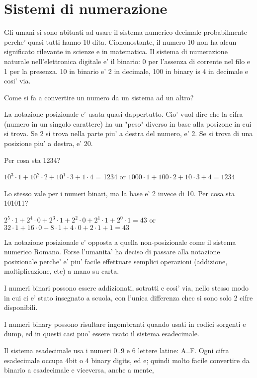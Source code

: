 \section{Sistemi di numerazione}

Gli umani si sono abituati ad usare il sistema numerico decimale probabilmente perche' quasi tutti hanno 10 dita.
Ciononostante, il numero 10 non ha alcun significato rilevante in scienze e in matematica.
Il sistema di numerazione naturale nell'elettronica digitale e' il binario: 0 per l'assenza di corrente nel filo e 1 per la presenza.
10 in binario e' 2 in decimale, 100 in binary is 4 in decimale e cosi' via.

Come si fa a convertire un numero da un sistema ad un altro?

La notazione posizionale e' usata quasi dappertutto. Cio' vuol dire che la cifra (numero in un singolo carattere) ha un "peso" diverso in base alla posizone in cui si trova. 
Se 2 si trova nella parte piu' a destra del numero, e' 2.
Se si trova di una posizione piu' a destra, e' 20.

Per cosa sta 1234?

$10^3 \cdot 1 + 10^2 \cdot 2 + 10^1 \cdot 3 + 1 \cdot 4$ = 1234 or 
$1000 \cdot 1 + 100 \cdot 2 + 10 \cdot 3 + 4 = 1234$

Lo stesso vale per i numeri binari, ma la base e' 2 invece di 10.
Per cosa sta 101011?

$2^5 \cdot 1 + 2^4 \cdot 0 + 2^3 \cdot 1 + 2^2 \cdot 0 + 2^1 \cdot 1 + 2^0 \cdot 1 = 43$ or
$32 \cdot 1 + 16 \cdot 0 + 8 \cdot 1 + 4 \cdot 0 + 2 \cdot 1 + 1 = 43$

La notazione posizionale e' opposta a quella non-posizionale come il sistema numerico Romano.
Forse l'umanita' ha deciso di passare alla notazione posizionale perche' e' piu' facile effettuare semplici operazioni (addizione, moltiplicazione, etc) a mano su carta.

I numeri binari possono essere addizionati, sotratti e cosi' via, nello stesso modo in cui ci e' stato insegnato a scuola, con l'unica differenza chec si sono solo 2 cifre disponibili.

I numeri binary possono risultare ingombranti quando usati in codici sorgenti e dump, ed in questi casi puo' essere usato il sistema esadecimale.

Il sistema esadecimale usa i numeri 0..9 e 6 lettere latine: A..F.
Ogni cifra esadecimale occupa 4bit o 4 binary digits, ed e; quindi molto facile convertire da binario a esadecimale e viceversa, anche a mente,


